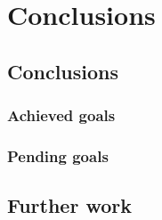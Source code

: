 
\chapter{Conclusions}

\label{conclusions}

\section{Conclusions}


\subsection{Achieved goals}


\subsection{Pending goals}

\newpage

\section{Further work}